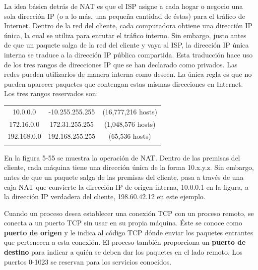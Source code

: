 \documentclass[10pt,a4paper]{report}
\begin{document}
	La idea básica detrás de NAT es que el ISP asigne a cada hogar o negocio una sola dirección IP
(o a lo más, una pequeña cantidad de éstas) para el tráfico de Internet. Dentro de la red del cliente, cada
computadora obtiene una dirección IP única, la cual se utiliza para enrutar el tráfico interno. Sin embargo, justo antes de que un paquete salga de la red del cliente y vaya al ISP, la dirección IP única interna se traduce a la dirección IP pública compartida. Esta traducción hace uso de los tres rangos de direcciones
IP que se han declarado como privados. Las redes pueden utilizarlos de manera interna como deseen. La
única regla es que no pueden aparecer paquetes que contengan estas mismas direcciones en Internet. Los
tres rangos reservados son:
\par
\par
	\begin{center}
	

	\begin{tabular}{ccc}
	10.0.0.0 & -10.255.255.255 & (16,777,216 hosts) \\ 
	\par
	172.16.0.0 & 172.31.255.255 & (1,048,576 hosts) \\ 
	\par
	192.168.0.0 & 192.168.255.255 & (65,536 hosts) \\ 
	\par
	\end{tabular} 
	\end{center}
	\par
	\par En la figura 5-55 se muestra la operación de NAT. Dentro de las premisas del cliente, cada máquina
tiene una dirección única de la forma 10.x.y.z. Sin embargo, antes de que un paquete salga de las premisas
del cliente, pasa a través de una caja NAT que convierte la dirección IP de origen interna, 10.0.0.1 en
la figura, a la dirección IP verdadera del cliente, 198.60.42.12 en este ejemplo.

\par Cuando un proceso desea establecer una conexión TCP con un proceso remoto, se conecta a un puerto
TCP sin usar en su propia máquina. Éste se conoce como \textbf{puerto de origen} y le indica al código TCP dónde enviar los paquetes entrantes que pertenecen a esta conexión. El proceso también proporciona un \textbf{puerto de destino} para indicar a quién se deben dar los paquetes en el lado remoto. Los puertos 0-1023 se reservan para los servicios conocidos.
\end{document}
